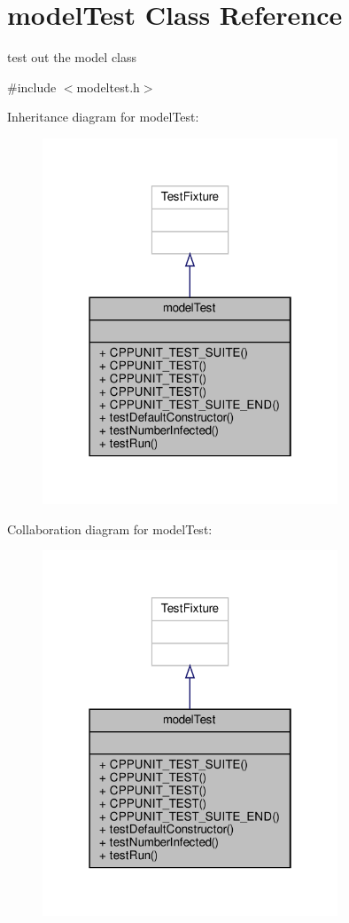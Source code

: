 \hypertarget{classmodelTest}{}\section{model\+Test Class Reference}
\label{classmodelTest}


test out the model class  




{\ttfamily \#include $<$modeltest.\+h$>$}



Inheritance diagram for model\+Test\+:\nopagebreak
\begin{figure}[H]
\begin{center}
\leavevmode
\includegraphics[width=250pt]{classmodelTest__inherit__graph}
\end{center}
\end{figure}


Collaboration diagram for model\+Test\+:\nopagebreak
\begin{figure}[H]
\begin{center}
\leavevmode
\includegraphics[width=250pt]{classmodelTest__coll__graph}
\end{center}
\end{figure}
